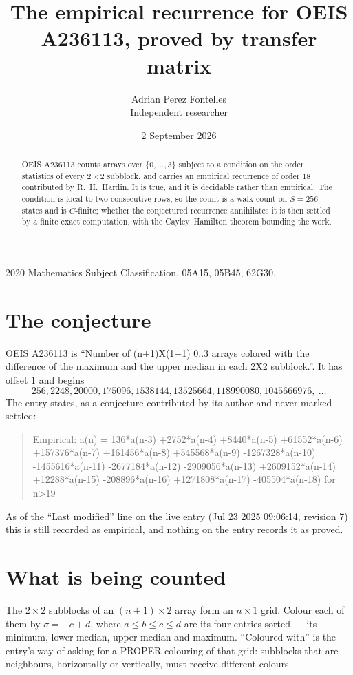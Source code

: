 \documentclass[11pt,a4paper]{article}
\title{The empirical recurrence for OEIS A236113, proved by transfer matrix}
\author{Adrian Perez Fontelles\\ \small Independent researcher}
\date{2 September 2026}
\theoremstyle{plain}
\theoremstyle{definition}
\begin{document}
\maketitle

\begin{abstract}
OEIS A236113 counts arrays over $\{0,\dots,3\}$ subject to a condition on the order
statistics of every $2\times2$ subblock, and carries an empirical recurrence of order
$18$ contributed by R.~H.~Hardin. It is true, and it is decidable rather than empirical.
The condition is local to two consecutive rows, so the count is a walk count on $S=256$
states and is $C$-finite; whether the conjectured recurrence annihilates it is then settled by
a finite exact computation, with the Cayley--Hamilton theorem bounding the work.
\end{abstract}

\noindent\small 2020 Mathematics Subject Classification. 05A15, 05B45, 62G30.\normalsize

\section{The conjecture}

OEIS A236113 is ``Number of (n+1)X(1+1) 0..3 arrays colored with the difference of the maximum and the upper median in each 2X2 subblock.''. It has offset $1$ and begins
\[
256, 2248, 20000, 175096, 1538144, 13525664, 118990080, 1045666976,\ \dots
\]
The entry states, as a conjecture contributed by its author and never marked settled:
\begin{quote}
Empirical: a(n) = 136*a(n-3) +2752*a(n-4) +8440*a(n-5) +61552*a(n-6) +157376*a(n-7) +161456*a(n-8) +545568*a(n-9) -1267328*a(n-10) -1455616*a(n-11) -2677184*a(n-12) -2909056*a(n-13) +2609152*a(n-14) +12288*a(n-15) -208896*a(n-16) +1271808*a(n-17) -405504*a(n-18) for n>19
\end{quote}
As of the ``Last modified'' line on the live entry (Jul 23 2025 09:06:14, revision 7) this is still
recorded as empirical, and nothing on the entry records it as proved.

\section{What is being counted}

The $2\times2$ subblocks of an $(n+1)\times2$ array form an
$n\times1$ grid. Colour each of them by $\sigma=-c+d$, where $a\le b\le c\le d$ are its four entries sorted --- its minimum, lower median, upper median and maximum. ``Coloured with'' is the entry's way of
asking for a PROPER colouring of that grid: subblocks that are neighbours, horizontally or
vertically, must receive different colours.
\end{document}
